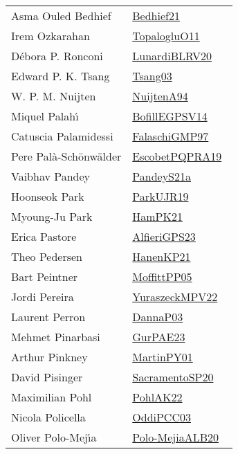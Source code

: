 {\begin{longtable}{p{4cm}p{20cm}}
Asma Ouled Bedhief & \href{works/Bedhief21.pdf}{Bedhief21}~\cite{Bedhief21}\\
Irem Ozkarahan & \href{works/TopalogluO11.pdf}{TopalogluO11}~\cite{TopalogluO11}\\
D{\'{e}}bora P. Ronconi & \href{works/LunardiBLRV20.pdf}{LunardiBLRV20}~\cite{LunardiBLRV20}\\
Edward P. K. Tsang & \href{works/Tsang03.pdf}{Tsang03}~\cite{Tsang03}\\
W. P. M. Nuijten & \href{}{NuijtenA94}~\cite{NuijtenA94}\\
Miquel Palah{\'{\i}} & \href{works/BofillEGPSV14.pdf}{BofillEGPSV14}~\cite{BofillEGPSV14}\\
Catuscia Palamidessi & \href{works/FalaschiGMP97.pdf}{FalaschiGMP97}~\cite{FalaschiGMP97}\\
Pere Pal{\`{a}}{-}Sch{\"{o}}nw{\"{a}}lder & \href{works/EscobetPQPRA19.pdf}{EscobetPQPRA19}~\cite{EscobetPQPRA19}\\
Vaibhav Pandey & \href{works/PandeyS21a.pdf}{PandeyS21a}~\cite{PandeyS21a}\\
Hoonseok Park & \href{works/ParkUJR19.pdf}{ParkUJR19}~\cite{ParkUJR19}\\
Myoung-Ju Park & \href{works/HamPK21.pdf}{HamPK21}~\cite{HamPK21}\\
Erica Pastore & \href{works/AlfieriGPS23.pdf}{AlfieriGPS23}~\cite{AlfieriGPS23}\\
Theo Pedersen & \href{works/HanenKP21.pdf}{HanenKP21}~\cite{HanenKP21}\\
Bart Peintner & \href{works/MoffittPP05.pdf}{MoffittPP05}~\cite{MoffittPP05}\\
Jordi Pereira & \href{works/YuraszeckMPV22.pdf}{YuraszeckMPV22}~\cite{YuraszeckMPV22}\\
Laurent Perron & \href{works/DannaP03.pdf}{DannaP03}~\cite{DannaP03}\\
Mehmet Pinarbasi & \href{works/GurPAE23.pdf}{GurPAE23}~\cite{GurPAE23}\\
Arthur Pinkney & \href{works/MartinPY01.pdf}{MartinPY01}~\cite{MartinPY01}\\
David Pisinger & \href{works/SacramentoSP20.pdf}{SacramentoSP20}~\cite{SacramentoSP20}\\
Maximilian Pohl & \href{works/PohlAK22.pdf}{PohlAK22}~\cite{PohlAK22}\\
Nicola Policella & \href{works/OddiPCC03.pdf}{OddiPCC03}~\cite{OddiPCC03}\\
Oliver Polo{-}Mej{\'{\i}}a & \href{}{Polo-MejiaALB20}~\cite{Polo-MejiaALB20}\\

\end{longtable}}
